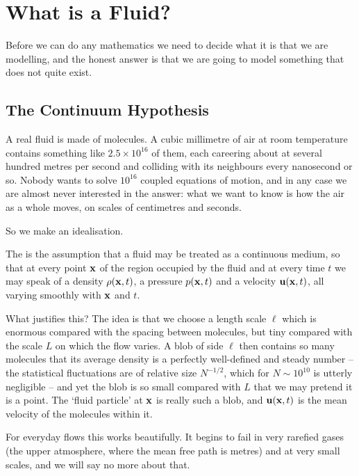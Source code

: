 \documentclass[a4paper]{scrartcl}
\begin{document}
\section{What is a Fluid?}

Before we can do any mathematics we need to decide what it is that we are modelling, and the honest answer is that we are going to model something that does not quite exist.

\subsection{The Continuum Hypothesis}

A real fluid is made of molecules. A cubic millimetre of air at room temperature contains something like $2.5 \times 10^{16}$ of them, each careering about at several hundred metres per second and colliding with its neighbours every nanosecond or so. Nobody wants to solve $10^{16}$ coupled equations of motion, and in any case we are almost never interested in the answer: what we want to know is how the air as a whole moves, on scales of centimetres and seconds.

So we make an idealisation.

\begin{definition}
	The  is the assumption that a fluid may be treated as a continuous medium, so that at every point $\mathbf{x}$ of the region occupied by the fluid and at every time $t$ we may speak of a density $\rho(\mathbf{x}, t)$, a pressure $p(\mathbf{x}, t)$ and a velocity $\mathbf{u} (\mathbf{x}, t)$, all varying smoothly with $\mathbf{x}$ and $t$.
\end{definition}

What justifies this? The idea is that we choose a length scale $\ell$ which is enormous compared with the spacing between molecules, but tiny compared with the scale $L$ on which the flow varies. A blob of side $\ell$ then contains so many molecules that its average density is a perfectly well-defined and steady number -- the statistical fluctuations are of relative size $N^{-1/2}$, which for $N \sim 10^{10}$ is utterly negligible -- and yet the blob is so small compared with $L$ that we may pretend it is a point. The `fluid particle' at $\mathbf{x}$ is really such a blob, and $\mathbf{u}(\mathbf{x}, t)$ is the mean velocity of the molecules within it.

For everyday flows this works beautifully. It begins to fail in very rarefied gases (the upper atmosphere, where the mean free path is metres) and at very small scales, and we will say no more about that.
\end{document}
